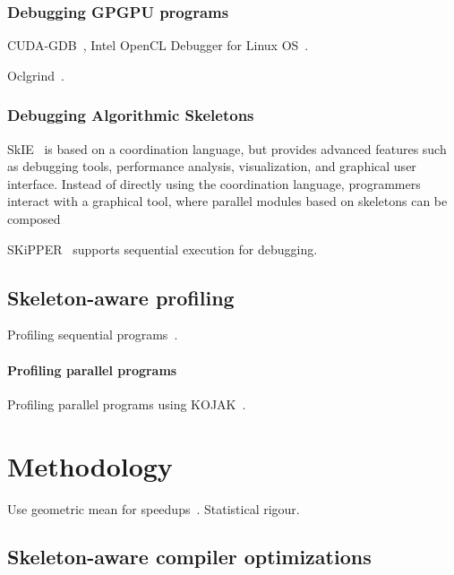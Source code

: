 \subsubsection{Debugging GPGPU programs}

CUDA-GDB~\cite{NVIDIA2016}, Intel OpenCL Debugger for Linux
OS~\cite{IntelCorporation2016}.

Oclgrind~\cite{Price2015}.


\subsubsection{Debugging Algorithmic Skeletons}

SkIE~\cite{Bacci1999} is based on a coordination language, but
provides advanced features such as debugging tools, performance
analysis, visualization, and graphical user interface. Instead of
directly using the coordination language, programmers interact with a
graphical tool, where parallel modules based on skeletons can be
composed

SKiPPER~\cite{Cezeaux1999} supports sequential execution for
debugging.


\subsection{Skeleton-aware profiling}

Profiling sequential programs~\cite{Ball1994}.

\paragraph{Profiling parallel programs} Profiling parallel programs
using KOJAK~\cite{Mohr2003}.


\section{Methodology}

Use geometric mean for speedups~\cite{Fleming1986}. Statistical
rigour\cite{Georges2007}.


\subsection{Skeleton-aware compiler optimizations}

